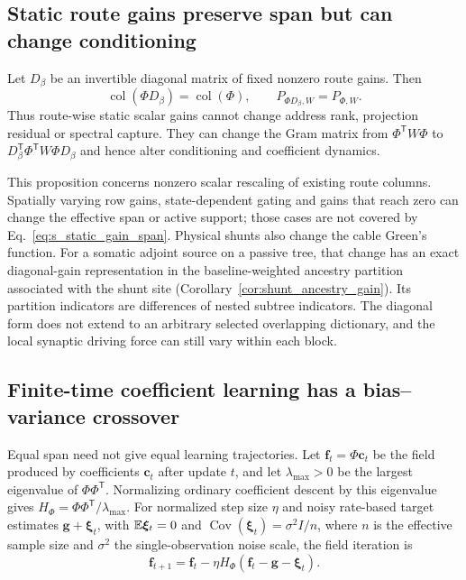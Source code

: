 \subsection{Static route gains preserve span but can change conditioning}

\begin{proposition}
Let $D_\beta$ be an invertible diagonal matrix of fixed nonzero route gains. Then
\begin{equation}
\operatorname{col}(\Phi D_\beta)=\operatorname{col}(\Phi),\qquad
P_{\Phi D_\beta,W}=P_{\Phi,W}.
\label{eq:s_static_gain_span}
\end{equation}
Thus route-wise static scalar gains cannot change address rank, projection
residual or spectral capture. They can change the Gram matrix from
$\Phi^{\mathsf T}W\Phi$ to
$D_\beta^{\mathsf T}\Phi^{\mathsf T}W\Phi D_\beta$ and hence alter
conditioning and coefficient dynamics.
\end{proposition}

This proposition concerns nonzero scalar rescaling of existing route columns.
Spatially varying row gains, state-dependent gating and gains that reach zero
can change the effective span or active support; those cases are not covered
by Eq.~\ref{eq:s_static_gain_span}. Physical shunts also change the cable
Green's function. For a somatic adjoint source on a passive tree, that change
has an exact diagonal-gain representation in the baseline-weighted ancestry
partition associated with the shunt site
(Corollary~\ref{cor:shunt_ancestry_gain}). Its partition indicators are
differences of nested subtree indicators. The diagonal form does not extend
to an arbitrary selected overlapping dictionary, and the local synaptic
driving force can still vary within each block.

\subsection{Finite-time coefficient learning has a bias--variance crossover}

Equal span need not give equal learning trajectories. Let
$\bm f_t=\Phi\bm c_t$ be the field produced by coefficients $\bm c_t$
after update $t$, and let $\lambda_{\max}>0$ be the largest eigenvalue of
$\Phi\Phi^{\mathsf T}$. Normalizing ordinary coefficient descent by
this eigenvalue gives $H_\Phi=\Phi\Phi^{\mathsf T}/\lambda_{\max}$.
For normalized step size $\eta$ and noisy rate-based target estimates
$\bm g+\bm\xi_t$, with
$\mathbb{E}\bm\xi_t=0$ and
$\operatorname{Cov}(\bm\xi_t)=\sigma^2I/n$, where $n$ is the effective
sample size and $\sigma^2$ the single-observation noise scale, the field
iteration is
\begin{equation}
\bm f_{t+1}=\bm f_t-\eta H_\Phi(\bm f_t-\bm g-\bm\xi_t).
\label{eq:s_coefficient_field_iteration}
\end{equation}


